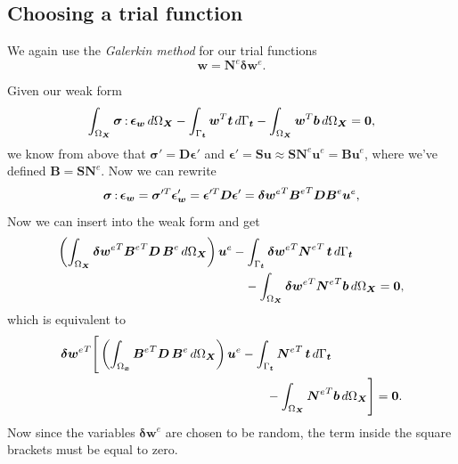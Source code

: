 \documentclass[acmtog]{acmart}
\newcommand{\ddotproduct}[2]{#1 \hspace{-1pt}:\hspace{-1pt} #2}
\begin{document}
\subsection{Choosing a trial function}
We again use the \textit{Galerkin method} for our trial functions
%
\begin{equation}
  \boldsymbol w = \boldsymbol N^e \boldsymbol \delta\boldsymbol w^e.
\end{equation}
%

Given our weak form
%
\begin{equation}
  \int_{\Omega_{\boldsymbol X}} \ddotproduct{\boldsymbol \sigma}{\boldsymbol \epsilon_{\boldsymbol w}} \, d\Omega_{\boldsymbol X}- \int_{\Gamma_{\boldsymbol t}} \boldsymbol w^T \boldsymbol t \, d\Gamma_{\boldsymbol t}- \int_{\Omega_{\boldsymbol X}} \boldsymbol w^T \boldsymbol b \, d\Omega_{\boldsymbol X} = \boldsymbol 0,
\end{equation}
%
we know from above that $\boldsymbol \sigma' = \boldsymbol D \boldsymbol \epsilon'$ and $\boldsymbol \epsilon' = \boldsymbol S \boldsymbol u \approx \boldsymbol S \boldsymbol N^e \boldsymbol u^e = \boldsymbol B \boldsymbol u^e$, where we've defined $\boldsymbol B = \boldsymbol S \boldsymbol N^e$. Now we can rewrite
%
\begin{equation}
  \ddotproduct{\boldsymbol \sigma}{\boldsymbol \epsilon_{\boldsymbol w}} = \boldsymbol \sigma'^T \boldsymbol \epsilon'_{\boldsymbol w} = \boldsymbol \epsilon'^T \boldsymbol D \boldsymbol \epsilon' = \boldsymbol \delta{\boldsymbol w^e}^T {\boldsymbol B^e}^T \boldsymbol D \boldsymbol B^e \boldsymbol u^e,
\end{equation}
%
Now we can insert into the weak form and get
%
\begin{align}
  \left( \int_{\Omega_{\boldsymbol X}} \boldsymbol \delta{\boldsymbol w^e}^T {\boldsymbol B^e}^T \boldsymbol D \, \boldsymbol B^e \, d\Omega_{\boldsymbol X} \right) \boldsymbol u^e
   & - \int_{\Gamma_{\boldsymbol t}} \boldsymbol \delta{\boldsymbol w^e}^T {\boldsymbol N^e}^T  \, \boldsymbol t \, d\Gamma_{\boldsymbol t} \notag             \\
   & \quad - \int_{\Omega_{\boldsymbol X}} \boldsymbol \delta{\boldsymbol w^e}^T {\boldsymbol N^e}^T \boldsymbol b \, d\Omega_{\boldsymbol X} = \boldsymbol 0,
\end{align}
%
which is equivalent to
%
\begin{align}
  \boldsymbol \delta{\boldsymbol w^e}^T\Bigg[\left( \int_{\Omega_{\boldsymbol x}} {\boldsymbol B^e}^T \boldsymbol D \, \boldsymbol B^e \, d\Omega_{\boldsymbol X} \right) \boldsymbol u^e
   & - \int_{\Gamma_{\boldsymbol t}} {\boldsymbol N^e}^T  \, \boldsymbol t \, d\Gamma_{\boldsymbol t} \notag                     \\
   & \qquad - \int_{\Omega_{\boldsymbol X}} {\boldsymbol N^e}^T \boldsymbol b \, d\Omega_{\boldsymbol X} \Bigg] = \boldsymbol 0.
\end{align}
%
Now since the variables $\boldsymbol \delta \boldsymbol w^e$ are chosen to be random, the term inside the square brackets must be equal to zero.
\end{document}
